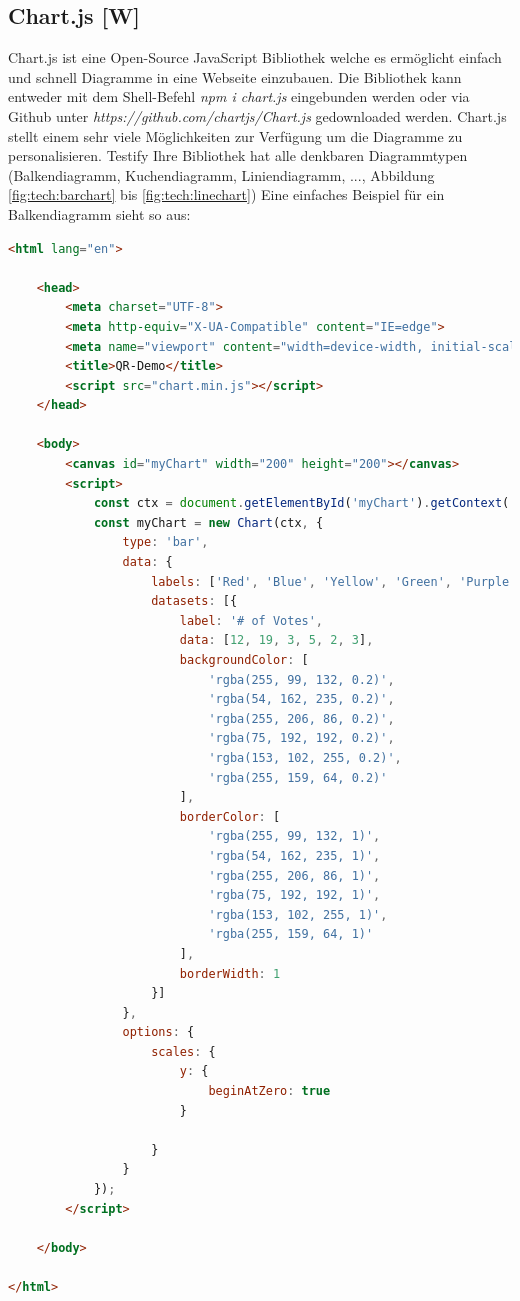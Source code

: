 \subsection{Chart.js [W]}  \label{ChartJs}%
Chart.js ist eine Open-Source JavaScript Bibliothek welche es ermöglicht einfach und schnell Diagramme
in eine Webseite einzubauen. Die Bibliothek kann entweder mit dem Shell-Befehl \textit{npm i chart.js} eingebunden werden oder via Github unter
\textit{https://github.com/chartjs/Chart.js} gedownloaded werden. Chart.js stellt einem sehr
viele Möglichkeiten zur Verfügung um die Diagramme zu personalisieren.
Testify
Ihre Bibliothek hat alle denkbaren Diagrammtypen (Balkendiagramm, Kuchendiagramm, Liniendiagramm, ..., Abbildung \ref{fig:tech:barchart} bis \ref{fig:tech:linechart})
Eine einfaches Beispiel für ein Balkendiagramm sieht so aus:
\begin{lstlisting}[language=html,caption=Balkendiagramm HTML Code,label=lst:tech:gaussianBlur]
<html lang="en">

    <head>
        <meta charset="UTF-8">
        <meta http-equiv="X-UA-Compatible" content="IE=edge">
        <meta name="viewport" content="width=device-width, initial-scale=1.0">
        <title>QR-Demo</title>
        <script src="chart.min.js"></script>
    </head>

    <body>
        <canvas id="myChart" width="200" height="200"></canvas>
        <script>
            const ctx = document.getElementById('myChart').getContext('2d');
            const myChart = new Chart(ctx, {
                type: 'bar',
                data: {
                    labels: ['Red', 'Blue', 'Yellow', 'Green', 'Purple', 'Orange'],
                    datasets: [{
                        label: '# of Votes',
                        data: [12, 19, 3, 5, 2, 3],
                        backgroundColor: [
                            'rgba(255, 99, 132, 0.2)',
                            'rgba(54, 162, 235, 0.2)',
                            'rgba(255, 206, 86, 0.2)',
                            'rgba(75, 192, 192, 0.2)',
                            'rgba(153, 102, 255, 0.2)',
                            'rgba(255, 159, 64, 0.2)'
                        ],
                        borderColor: [
                            'rgba(255, 99, 132, 1)',
                            'rgba(54, 162, 235, 1)',
                            'rgba(255, 206, 86, 1)',
                            'rgba(75, 192, 192, 1)',
                            'rgba(153, 102, 255, 1)',
                            'rgba(255, 159, 64, 1)'
                        ],
                        borderWidth: 1
                    }]
                },
                options: {
                    scales: {
                        y: {
                            beginAtZero: true
                        }
                        
                    }
                }
            });
        </script>

    </body>

</html>
\end{lstlisting}
